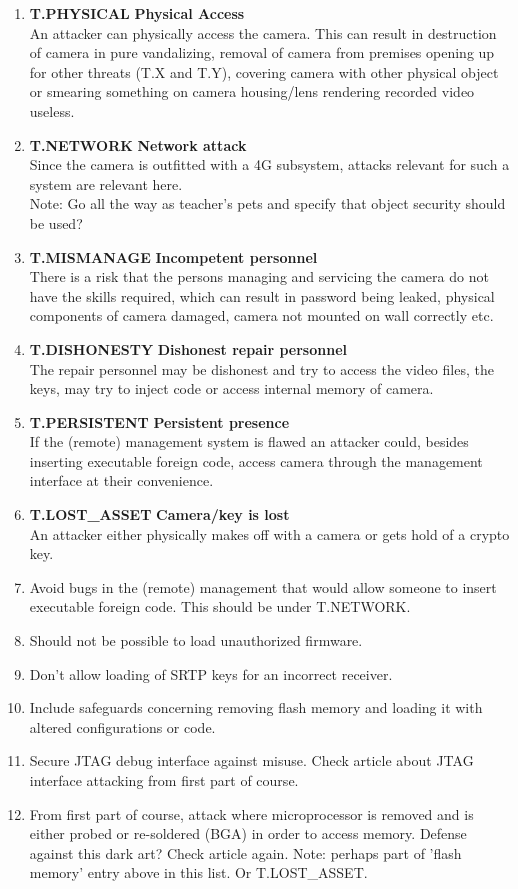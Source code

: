 \documentclass[10pt]{article}
\newcommand{\threat}[3]{\item{\textbf{T.#1} \hfill \textbf{#2} \\ #3}}
\begin{document}
  \begin{enumerate}
    \threat{PHYSICAL}{Physical Access} {
	An attacker can physically access the camera. This can result in destruction of camera in pure vandalizing, removal of camera from premises opening up for other threats (T.X and T.Y), 
	covering camera with other physical object or smearing something on camera housing/lens rendering recorded video useless. }
    \threat{NETWORK}{Network attack} {
	Since the camera is outfitted with a 4G subsystem, attacks relevant for such a system are relevant here. \\
	Note: Go all the way as teacher's pets and specify that object security should be used?}
    \threat{MISMANAGE}{Incompetent personnel} {
	There is a risk that the persons managing and servicing the camera do not have the skills required, which can result in password being leaked, physical components of camera damaged, camera not mounted on wall correctly etc.}
    \threat{DISHONESTY}{Dishonest repair personnel}{ %
	The repair personnel may be dishonest and try to access the video files, the keys, may try to inject code or access internal memory of camera.}
    \threat{PERSISTENT}{Persistent presence}{
	If the (remote) management system is flawed an attacker could, besides inserting executable foreign code, access camera through the management interface at their convenience.}
    \threat{LOST\_ASSET}{Camera/key is lost}{An attacker either physically makes off with a camera or gets hold of a crypto key.}

    \item{Avoid bugs in the (remote) management that would allow someone to
      insert executable foreign code. This should be under T.NETWORK.}
    \item{Should not be possible to load unauthorized firmware.}
    \item{Don't allow loading of SRTP keys for an incorrect receiver.}
    \item{Include safeguards concerning removing flash memory and loading it
      with altered configurations or code.}
    \item{Secure JTAG debug interface against misuse. Check article about JTAG interface attacking from first part of course.}
    \item{From first part of course, attack where microprocessor is removed and is either probed or re-soldered (BGA) in order to access memory. Defense against this dark art? Check article again. Note: perhaps part of 'flash memory' entry above in this list. Or T.LOST\_ASSET.}
  \end{enumerate}
\end{document}
